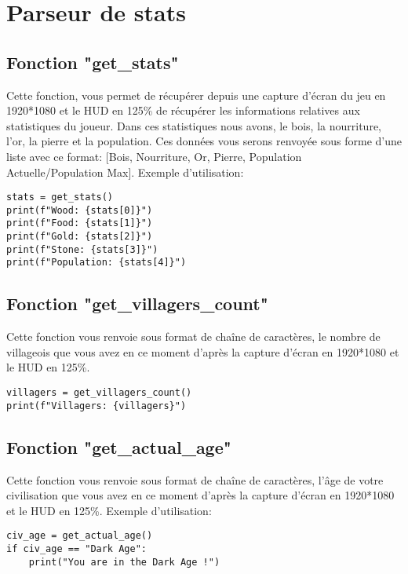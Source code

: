 
\section{Parseur de stats}
\subsection{Fonction "get\_stats"}
Cette fonction, vous permet de récupérer depuis une capture d'écran du jeu en 1920*1080 et le HUD en 125\% de récupérer les informations relatives aux statistiques du joueur. Dans ces statistiques nous avons, le bois, la nourriture, l'or, la pierre et la population. Ces données vous serons renvoyée sous forme d'une liste avec ce format: [Bois, Nourriture, Or, Pierre, Population Actuelle/Population Max].
Exemple d'utilisation:

\begin{verbatim}
stats = get_stats()
print(f"Wood: {stats[0]}")
print(f"Food: {stats[1]}")
print(f"Gold: {stats[2]}")
print(f"Stone: {stats[3]}")
print(f"Population: {stats[4]}")
\end{verbatim}

\subsection{Fonction "get\_villagers\_count"}
Cette fonction vous renvoie sous format de chaîne de caractères, le nombre de villageois que vous avez en ce moment d'après la capture d'écran en 1920*1080 et le HUD en 125\%.

\begin{verbatim}
villagers = get_villagers_count()
print(f"Villagers: {villagers}")
\end{verbatim}

\subsection{Fonction "get\_actual\_age"}
Cette fonction vous renvoie sous format de chaîne de caractères, l'âge de votre civilisation que vous avez en ce moment d'après la capture d'écran en 1920*1080 et le HUD en 125\%.
Exemple d'utilisation:

\begin{verbatim}
civ_age = get_actual_age()
if civ_age == "Dark Age":
    print("You are in the Dark Age !")
\end{verbatim}